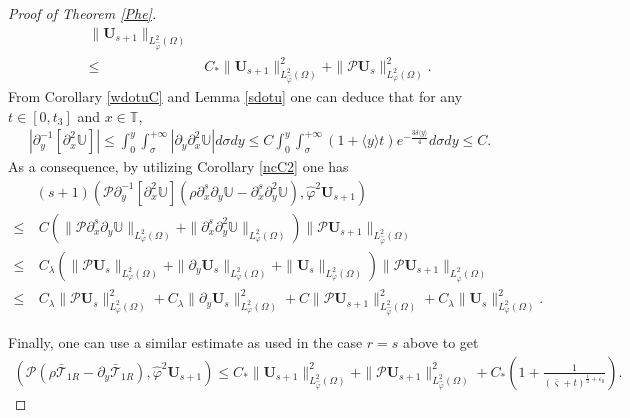 \documentclass[10pt,a4paper]{amsart}
\newcommand\y{{{\langle y \rangle}}}
\begin{document}
\begin{proof}[Proof of Theorem \ref{Phe}]
\begin{align}
       \|\mathbf{U}_{s+1}\|_{L_{\hat{\varphi}}^{2}(\Omega)}\nonumber\\
\leq&~C_{*}\|\mathbf{U}_{s+1}\|_{L_{\hat{\varphi}}^{2}(\Omega)}^{2}
     +\|\mathcal{P}\mathbf{U}_{s}\|_{L_{\varphi}^{2}(\Omega)}^{2}.\nonumber
\end{align}
From Corollary \ref{wdotuC} and Lemma \ref{sdotu} one can deduce that for any $t\in[0,t_{3}]$ and $x\in\mathbb{T}$,
\begin{align*}
|\partial_{y}^{-1}[\partial_{x}^{2}\mathbb{U}]|
\leq \int_{0}^{y}\int_{\sigma}^{+\infty}|\partial_{y}\partial_{x}^{2}\mathbb{U}|d\sigma dy
\leq C\int_{0}^{y}\int_{\sigma}^{+\infty}(1+\y t)e^{-\frac{3\delta\y}{4}}d\sigma dy
\leq C.
\end{align*}
As a consequence,  by utilizing Corollary \ref{ncC2} one has
\begin{align}\label{J64'}
&(s+1)\left(\mathcal{P}\partial_{y}^{-1}[\partial_{x}^{2}\mathbb{U}](\rho\partial_{x}^{s}\partial_{y}\mathbb{U}-\partial_{x}^{s}\partial_{y}^{2}\mathbb{U}),\hat{\varphi}^{2}\mathbf{U}_{s+1}\right)\\
\leq&~C\left(\|\mathcal{P}\partial_{x}^{s}\partial_{y}\mathbb{U}\|_{L_{\varphi}^{2}(\Omega)}
             +\|\partial_{x}^{s}\partial_{y}^{2}\mathbb{U}\|_{L_{\varphi}^{2}(\Omega)}\right)
       \|\mathcal{P}\mathbf{U}_{s+1}\|_{L_{\hat{\varphi}}^{2}(\Omega)}\nonumber\\
\leq&~C_{\lambda}\left(\|\mathcal{P}\mathbf{U}_{s}\|_{L_{\varphi}^{2}(\Omega)}
             +\|\partial_{y}\mathbf{U}_{s}\|_{L_{\varphi}^{2}(\Omega)}
             +\|\mathbf{U}_{s}\|_{L_{\varphi}^{2}(\Omega)}\right)
       \|\mathcal{P}\mathbf{U}_{s+1}\|_{L_{\hat{\varphi}}^{2}(\Omega)}\nonumber\\
\leq&~C_{\lambda}\|\mathcal{P}\mathbf{U}_{s}\|_{L_{\varphi}^{2}(\Omega)}^{2}
     +C_{\lambda}\|\partial_{y}\mathbf{U}_{s}\|_{L_{\varphi}^{2}(\Omega)}^{2}
     +C\|\mathcal{P}\mathbf{U}_{s+1}\|_{L_{\hat{\varphi}}^{2}(\Omega)}^{2}
     +C_{\lambda}\|\mathbf{U}_{s}\|_{L_{\varphi}^{2}(\Omega)}^{2}\nonumber.
\end{align}

Finally, one can use a similar estimate as used in the case $r=s$ above to get
\begin{align}\label{J65}
\left(\mathcal{P}(\rho\bar{\mathcal{T}}_{1R}-\partial_{y}\bar{\mathcal{T}}_{1R}),\hat{\varphi}^{2}\mathbf{U}_{s+1}\right)
\leq  C_{*}\|\mathbf{U}_{s+1}\|_{L_{\hat{\varphi}}^{2}(\Omega)}^{2}
     +\|\mathcal{P}\mathbf{U}_{s+1}\|_{L_{\hat{\varphi}}^{2}(\Omega)}^{2}
     +C_{*}\left(1+\frac{1}{(\bar{\varsigma}+t)^{\frac{1}{2}+\varepsilon_{0}}}\right).
\end{align}


\end{proof}
\end{document}
